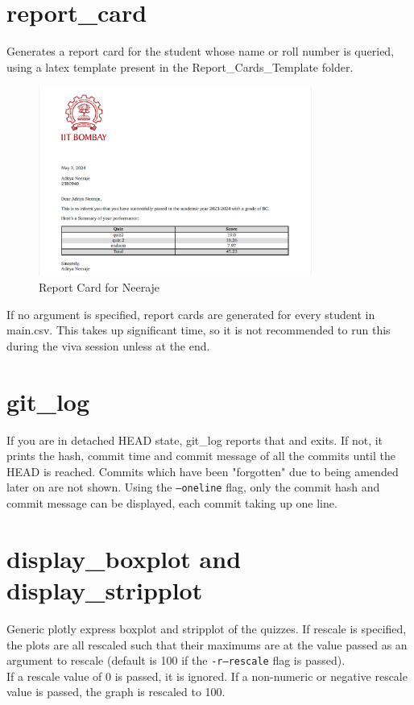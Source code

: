 \documentclass{article}
\begin{document}
    \section{report\_card}
    Generates a report card for the student whose name or roll number is queried, using a latex template present in the Report\_Cards\_Template folder.\\
    \begin{figure}[htbp]
        \centering
        \includegraphics[width=0.8\textwidth]{report_card.png}
        \caption{Report Card for Neeraje}
        \label{fig:report_card}
    \end{figure}
    If no argument is specified, report cards are generated for every student in main.csv. This takes up significant time, so it is not recommended to run this during the viva session unless at the end.

    \section{git\_log}
    If you are in detached HEAD state, git\_log reports that and exits. If not, it prints the hash, commit time and commit message of all the commits until the HEAD is reached. Commits which have been "forgotten" due to being amended later on are not shown.
    Using the \texttt{--oneline} flag, only the commit hash and commit message can be displayed, each commit taking up one line.
    
    \section{display\_boxplot and display\_stripplot}
    Generic plotly express boxplot and stripplot of the quizzes. If rescale is specified, the plots are all rescaled such that their maximums are at the value passed as an argument to rescale (default is 100 if the \texttt{-r}\texttt{--rescale} flag is passed).\\
    If a rescale value of 0 is passed, it is ignored. If a non-numeric or negative rescale value is passed, the graph is rescaled to 100.
\end{document}

